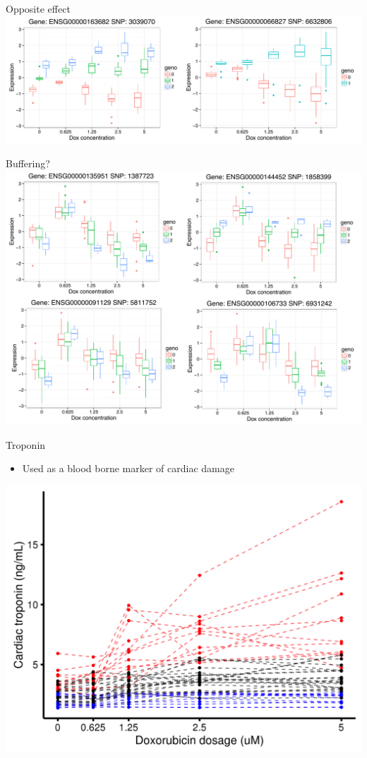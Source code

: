 \documentclass{beamer}
\begin{document}
\begin{frame}{Opposite effect}
\centering
\includegraphics[width=\textwidth,clip,trim=0 0 0 0]{../figures/iqtl_types/opposite_effect.pdf}
\end{frame}

\begin{frame}{Buffering?}
\centering
\includegraphics[width=\textwidth,clip,trim=0 0 0 0]{../figures/iqtl_types/buffering.pdf}
\end{frame}

\begin{frame}{Troponin}
\begin{itemize}
\item Used as a blood borne marker of cardiac damage
\end{itemize}
\centering
\includegraphics[width=\textwidth,clip,trim=0 0 0 0]{../figures/troponin.png}
\end{frame}
\end{document}
